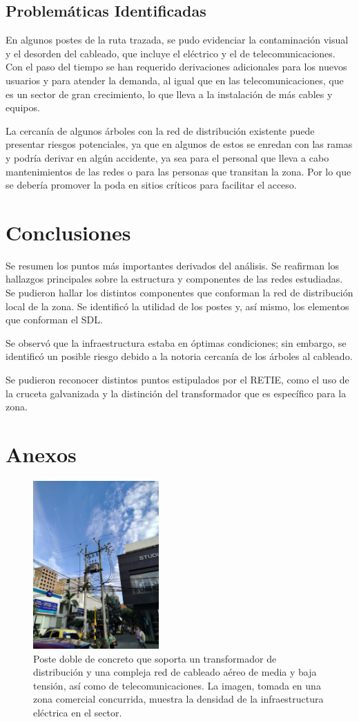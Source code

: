 \subsection{Problemáticas Identificadas}
En algunos postes de la ruta trazada, se pudo evidenciar la contaminación visual y el desorden del cableado, que incluye el eléctrico y el de telecomunicaciones. Con el paso del tiempo se han requerido derivaciones adicionales para los nuevos usuarios y para atender la demanda, al igual que en las telecomunicaciones, que es un sector de gran crecimiento, lo que lleva a la instalación de más cables y equipos.

La cercanía de algunos árboles con la red de distribución existente puede presentar riesgos potenciales, ya que en algunos de estos se enredan con las ramas y podría derivar en algún accidente, ya sea para el personal que lleva a cabo mantenimientos de las redes o para las personas que transitan la zona. Por lo que se debería promover la poda en sitios críticos para facilitar el acceso.

\section{Conclusiones}
Se resumen los puntos más importantes derivados del análisis. Se reafirman los hallazgos principales sobre la estructura y componentes de las redes estudiadas. Se pudieron hallar los distintos componentes que conforman la red de distribución local de la zona. Se identificó la utilidad de los postes y, así mismo, los elementos que conforman el SDL.

Se observó que la infraestructura estaba en óptimas condiciones; sin embargo, se identificó un posible riesgo debido a la notoria cercanía de los árboles al cableado.

Se pudieron reconocer distintos puntos estipulados por el RETIE, como el uso de la cruceta galvanizada y la distinción del transformador que es específico para la zona.

\section{Anexos}
\begin{figure}[H]
    \centering
    \includegraphics[width=0.43\textwidth, height=0.43\textwidth]{fig_/8}
    \caption{Poste doble de concreto que soporta un transformador de distribución y una compleja red de cableado aéreo de media y baja tensión, así como de telecomunicaciones. La imagen, tomada en una zona comercial concurrida, muestra la densidad de la infraestructura eléctrica en el sector.}
    \label{fig:a8}
\end{figure}

